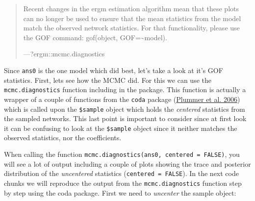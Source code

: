 \documentclass[
]{book}
\newenvironment{Shaded}{\begin{snugshade}}{\end{snugshade}}
\newcommand{\AttributeTok}[1]{\textcolor[rgb]{0.13,0.29,0.53}{#1}}
\newcommand{\CommentTok}[1]{\textcolor[rgb]{0.56,0.35,0.01}{\textit{#1}}}
\newcommand{\ConstantTok}[1]{\textcolor[rgb]{0.56,0.35,0.01}{#1}}
\newcommand{\ControlFlowTok}[1]{\textcolor[rgb]{0.13,0.29,0.53}{\textbf{#1}}}
\newcommand{\DecValTok}[1]{\textcolor[rgb]{0.00,0.00,0.81}{#1}}
\newcommand{\FunctionTok}[1]{\textcolor[rgb]{0.13,0.29,0.53}{\textbf{#1}}}
\newcommand{\NormalTok}[1]{#1}
\newcommand{\OtherTok}[1]{\textcolor[rgb]{0.56,0.35,0.01}{#1}}
\newcommand{\SpecialCharTok}[1]{\textcolor[rgb]{0.81,0.36,0.00}{\textbf{#1}}}
\begin{document}
\begin{quote}
Recent changes in the ergm estimation algorithm mean that these plots can no longer be used to ensure that the mean statistics from the model match the observed network statistics. For that functionality, please use the GOF command: gof(object, GOF=\textasciitilde model).

---?ergm::mcmc.diagnostics
\end{quote}

Since \texttt{ans0} is the one model which did best, let's take a look at it's GOF statistics. First, lets see how the MCMC did. For this we can use the \texttt{mcmc.diagnostics} function including in the package. This function is actually a wrapper of a couple of functions from the \texttt{coda} package (\protect\hyperlink{ref-R-coda}{Plummer et al. 2006}) which is called upon the \texttt{\$sample} object which holds the \emph{centered} statistics from the sampled networks. This last point is important to consider since at first look it can be confusing to look at the \texttt{\$sample} object since it neither matches the observed statistics, nor the coefficients.

When calling the function \texttt{mcmc.diagnostics(ans0,\ centered\ =\ FALSE)}, you will see a lot of output including a couple of plots showing the trace and posterior distribution of the \emph{uncentered} statistics (\texttt{centered\ =\ FALSE}). In the next code chunks we will reproduce the output from the \texttt{mcmc.diagnostics} function step by step using the coda package. First we need to \emph{uncenter} the sample object:

\begin{Shaded}
\end{Shaded}
\end{document}
